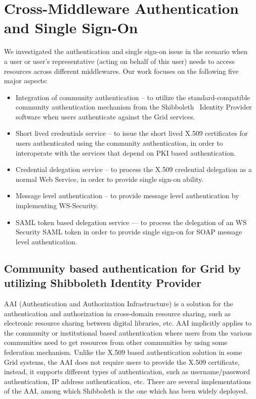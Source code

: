 \documentclass[twocolumn]{svjour3}         %
\begin{document}
\section{Cross-Middleware Authentication and Single Sign-On}
\label{sec:siglesignon}
We investigated the authentication and single sign-on issue in the scenario when a user or user's representative (acting on behalf of this user) needs to access resources across different middlewares. Our work focuses on the following five major aspects:
\begin{itemize}
	\item Integration of community authentication -- to utilize the standard-compatible community authentication mechanism from the Shibboleth~\cite{Shiblink} Identity Provider software when users authenticate against the Grid services.
	\item Short lived credentials service -- to issue the short lived X.509 certificates for users authenticated using the community authentication, in order to interoperate with the services that depend on PKI based authentication.
	\item Credential delegation service -- to process the X.509 credential delegation as a normal Web Service, in order to provide single sign-on ability.
	\item Message level authentication -- to provide message level authentication by implementing WS-Security.
	\item SAML token based delegation service --- to process the delegation of an WS Security SAML token in order to provide single sign-on for SOAP message level authentication.
\end{itemize}

\subsection{Community based authentication for Grid by utilizing Shibboleth Identity Provider}
\label{sec:communityauthn}
AAI (Authentication and Authorization Infrastructure) is a solution for the authentication and authorization in cross-domain resource sharing, such as electronic resource sharing between digital libraries, etc. AAI implicitly applies to the community or institutional based authentication where users from the various communities need to get resources from other communities by using some federation mechanism. Unlike the X.509 based authentication solution in some Grid systems, the AAI does not require users to provide the X.509 certificate, instead, it supports different types of authentication, such as username/password authentication, IP address authentication, etc. There are several implementations of the AAI, among which Shibboleth is the one which has been widely deployed.
\end{document}
